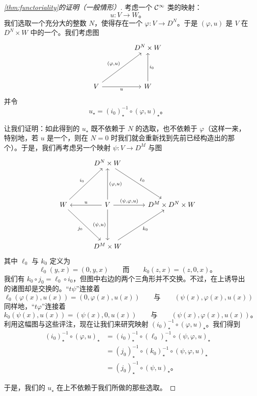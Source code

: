 \begin{proof}[\cref{thm:functoriality}的证明（一般情形）]
考虑一个 $\mathcal{C}^\infty$ 类的映射：
\[
u\colon V\longrightarrow W\text{。}
\]
我们选取一个充分大的整数 $N$，使得存在一个\trEmbedding{} $\varphi\colon V\to D^N$。于是 $(\varphi,u)$ 是 $V$ 在 $D^N\times W$ 中的一个\trEmbedding。我们考虑图
\[
\begin{tikzcd}[column sep=1.5cm,row sep=1.45cm]
& D^N\times W \\
V \ar[ur,"{(\varphi,u)}"] \ar[r,"u"'] & W \ar[u,"i_0"']
\end{tikzcd}
\]
并令
\[
u_\star=(i_0)_\star^{-1}\circ(\varphi,u)_\star\text{。}
\]

让我们证明：如此得到的\trMorphism{} $u_\star$ 既不依赖于 $N$ 的选取，也不依赖于 $\varphi$（这样一来，特别地，若 $u$ 是一个\trEmbedding，则在 $N=0$ 时我们就会重新找到先前已经构造出的那个\trMorphism）。于是，我们再考虑另一个映射 $\psi\colon V\to D^M$ 与图
\[
\begin{tikzcd}[column sep=1.05cm,row sep=1.55cm]
 & D^N\times W \ar[dr,"\ell_0"] & \\
 W \ar[ur,"i_0"] \ar[dr,"j_0"']
   & V \ar[l,"u"'] \ar[u,"{(\varphi,u)}"'] \ar[r,"{(\psi,\varphi,u)}"] \ar[d,"{(\psi,u)}"']
   & D^M\times D^N\times W \\
 & D^M\times W \ar[ur,"k_0"'] &
\end{tikzcd}
\]
其中 $\ell_0$ 与 $k_0$ 定义为
\[
\ell_0(y,x)=(0,y,x)
\qquad\text{而}\qquad
k_0(z,x)=(z,0,x)\text{。}
\]
我们有 $k_0\circ j_0=\ell_0\circ i_0$，但图中右边的两个三角形并不交换。不过，在\trHomology{}上诱导出的诸图却是交换的。\trHomotopy{}“$t\psi$”连接着
\[
\ell_0(\varphi(x),u(x))=(0,\varphi(x),u(x))
\qquad\text{与}\qquad
(\psi(x),\varphi(x),u(x))
\]
同样地，\trHomotopy{}“$t\varphi$”连接着
\[
k_0(\psi(x),u(x))=(\psi(x),0,u(x))
\qquad\text{与}\qquad
(\psi(x),\varphi(x),u(x))\text{。}
\]
利用这幅图与这些评注，现在让我们来研究映射 $(i_0)_\star^{-1}\circ(\varphi,u)_\star$。我们得到
\[
\begin{aligned}
(i_0)_\star^{-1}\circ(\varphi,u)_\star
  &=(i_0)_\star^{-1}\circ(\ell_0)_\star^{-1}\circ(\psi,\varphi,u)_\star\\
  &=(j_0)_\star^{-1}\circ(k_0)_\star^{-1}\circ(\psi,\varphi,u)_\star\\
  &=(j_0)_\star^{-1}\circ(\psi,u)_\star\text{。}
\end{aligned}
\]

于是，我们的\trMorphism{} $u_\star$ 在\trHomology{}上不依赖于我们所做的那些选取。


\end{proof}
